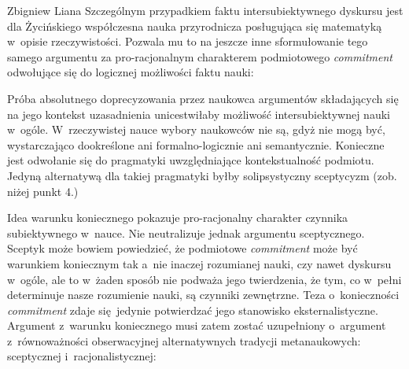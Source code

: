 \begin{artplenv}{Zbigniew Liana}
Szczególnym przypadkiem faktu intersubiektywnego dyskursu jest dla Życińskiego współczesna nauka przyrodnicza posługująca się matematyką w~opisie rzeczywistości. Pozwala mu to na jeszcze inne sformułowanie tego samego argumentu za pro-racjonalnym charakterem podmiotowego \textit{commitment} odwołujące się do logicznej możliwości faktu nauki:



Próba absolutnego doprecyzowania przez naukowca argumentów składających się na jego kontekst uzasadnienia unicestwiłaby możliwość intersubiektywnej nauki w~ogóle. W~rzeczywistej nauce wybory naukowców nie są, gdyż nie mogą być, wystarczająco dookreślone ani formalno-logicznie ani semantycznie. Konieczne jest odwołanie się do pragmatyki uwzględniające kontekstualność podmiotu. Jedyną alternatywą dla takiej pragmatyki byłby solipsystyczny sceptycyzm (zob. niżej punkt 4.)

Idea warunku koniecznego pokazuje pro-racjonalny charakter czynnika subiektywnego w~nauce. Nie neutralizuje jednak argumentu sceptycznego. Sceptyk może bowiem powiedzieć, że podmiotowe \textit{commitment} może być warunkiem koniecznym tak a~nie inaczej rozumianej nauki, czy nawet dyskursu w~ogóle, ale to w~żaden sposób nie podważa jego twierdzenia, że tym, co w~pełni determinuje nasze rozumienie nauki, są czynniki zewnętrzne. Teza o~konieczności \textit{commitment} zdaje się~jedynie potwierdzać jego stanowisko eksternalistyczne. Argument z~warunku koniecznego musi zatem zostać uzupełniony o~argument z~równoważności obserwacyjnej alternatywnych tradycji metanaukowych: sceptycznej i~racjonalistycznej:




\end{artplenv}
